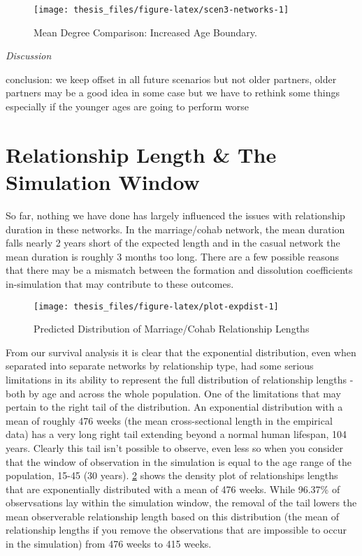 \documentclass [11pt, proquest] {uwthesis}[2015/03/03]
\begin{document}
\begin{figure}

{\centering \texttt{[image: thesis\_files/figure-latex/scen3-networks-1]} 

}

\caption{Mean Degree Comparison: Increased Age Boundary.}\label{fig:scen3-networks}
\end{figure}
\emph{Discussion}

conclusion: we keep offset in all future scenarios but not older
partners, older partners may be a good idea in some case but we have to
rethink some things especially if the younger ages are going to perform
worse

\section{Relationship Length \& The Simulation
Window}\label{relationship-length-the-simulation-window}

So far, nothing we have done has largely influenced the issues with
relationship duration in these networks. In the marriage/cohab network,
the mean duration falls nearly 2 years short of the expected length and
in the casual network the mean duration is roughly 3 months too long.
There are a few possible reasons that there may be a mismatch between
the formation and dissolution coefficients in-simulation that may
contribute to these outcomes.
\begin{figure}

{\centering \texttt{[image: thesis\_files/figure-latex/plot-expdist-1]} 

}

\caption{Predicted Distribution of Marriage/Cohab Relationship Lengths}\label{fig:plot-expdist}
\end{figure}
From our survival analysis it is clear that the exponential
distribution, even when separated into separate networks by relationship
type, had some serious limitations in its ability to represent the full
distribution of relationship lengths - both by age and across the whole
population. One of the limitations that may pertain to the right tail of
the distribution. An exponential distribution with a mean of roughly 476
weeks (the mean cross-sectional length in the empirical data) has a very
long right tail extending beyond a normal human lifespan, 104 years.
Clearly this tail isn't possible to observe, even less so when you
consider that the window of observation in the simulation is equal to
the age range of the population, 15-45 (30 years).
\ref{fig:plot-expdist} shows the density plot of relationships lengths
that are exponentially distributed with a mean of 476 weeks. While
96.37\% of observsations lay within the simulation window, the removal
of the tail lowers the mean observerable relationship length based on
this distribution (the mean of relationship lengths if you remove the
observations that are impossible to occur in the simulation) from 476
weeks to 415 weeks.
\end{document}

